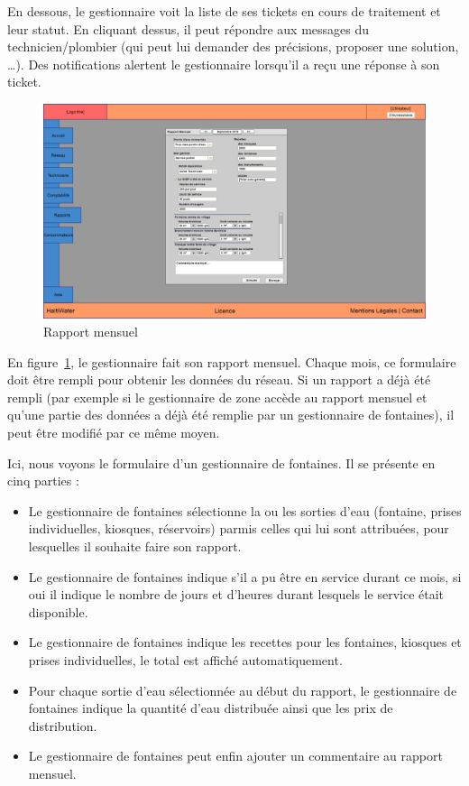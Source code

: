 \documentclass[a4paper, 11pt]{article}
\begin{document}
    En dessous, le gestionnaire voit la liste de ses tickets en cours de traitement et leur statut. En cliquant dessus, il peut répondre aux messages du technicien/plombier (qui peut lui demander des précisions, proposer une solution, \dots). Des notifications alertent le gestionnaire lorsqu'il a reçu une réponse à son ticket.

    \begin{figure}[H]
        \centering
        \includegraphics[width=.8\textwidth]{Cahier_des_Charges/rapports_mensuel}
        \caption{Rapport mensuel}
        \label{fig:monthly_report}
    \end{figure}

    En figure~\ref{fig:monthly_report}, le gestionnaire fait son rapport mensuel. Chaque mois, ce formulaire doit être rempli pour obtenir les données du réseau. Si un rapport a déjà été rempli (par exemple si le gestionnaire de zone accède au rapport mensuel et qu'une partie des données a déjà été remplie par un gestionnaire de fontaines), il peut être modifié par ce même moyen.

    Ici, nous voyons le formulaire d'un gestionnaire de fontaines. Il se présente en cinq parties :
    \begin{itemize}
      \item Le gestionnaire de fontaines sélectionne la ou les sorties d'eau (fontaine, prises individuelles, kiosques, réservoirs) parmis celles qui lui sont attribuées, pour lesquelles il souhaite faire son rapport.
      \item Le gestionnaire de fontaines indique s'il a pu être en service durant ce mois, si oui il indique le nombre de jours et d'heures durant lesquels le service était disponible.
      \item Le gestionnaire de fontaines indique les recettes pour les fontaines, kiosques et prises individuelles, le total est affiché automatiquement.
      \item Pour chaque sortie d'eau sélectionnée au début du rapport, le gestionnaire de fontaines indique la quantité d'eau distribuée ainsi que les prix de distribution.
      \item Le gestionnaire de fontaines peut enfin ajouter un commentaire au rapport mensuel.
    \end{itemize}
\end{document}
